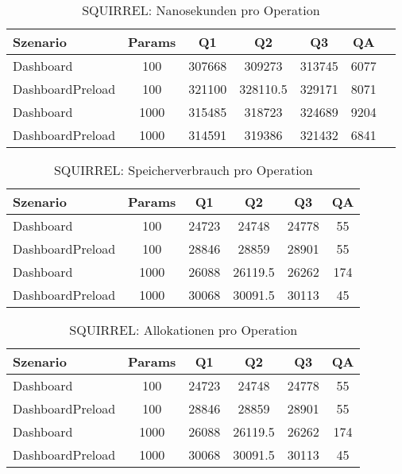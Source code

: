 
\begin{table}[ht]
\centering
\caption{SQUIRREL: Nanosekunden pro Operation}
\begin{tabular}{lcccccc}
\toprule
Szenario & Params & Q1 & Q2 & Q3 & QA \\
\midrule
	Dashboard & 100 & 307668 & 309273 & 313745 & 6077 \\
	DashboardPreload & 100 & 321100 & 328110.5 & 329171 & 8071 \\
	Dashboard & 1000 & 315485 & 318723 & 324689 & 9204 \\
	DashboardPreload & 1000 & 314591 & 319386 & 321432 & 6841 \\
\bottomrule
\end{tabular}
\label{tab:benchmark_squirrel_nsperop}
\end{table}
	
\begin{table}[ht]
\centering
\caption{SQUIRREL: Speicherverbrauch pro Operation}
\begin{tabular}{lccccc}
\toprule
Szenario & Params & Q1 & Q2 & Q3 & QA \\
\midrule
	Dashboard & 100 & 24723 & 24748 & 24778 & 55 \\
	DashboardPreload & 100 & 28846 & 28859 & 28901 & 55 \\
	Dashboard & 1000 & 26088 & 26119.5 & 26262 & 174 \\
	DashboardPreload & 1000 & 30068 & 30091.5 & 30113 & 45 \\
\bottomrule
\end{tabular}
\label{tab:benchmark_squirrel_bytesperop}
\end{table}
	
\begin{table}[ht]
\centering
\caption{SQUIRREL: Allokationen pro Operation}
\begin{tabular}{lccccc}
\toprule
Szenario & Params & Q1 & Q2 & Q3 & QA \\
\midrule
	Dashboard & 100 & 24723 & 24748 & 24778 & 55 \\
	DashboardPreload & 100 & 28846 & 28859 & 28901 & 55 \\
	Dashboard & 1000 & 26088 & 26119.5 & 26262 & 174 \\
	DashboardPreload & 1000 & 30068 & 30091.5 & 30113 & 45 \\
\bottomrule
\end{tabular}
\label{tab:benchmark_squirrel_allocsperop}
\end{table}
	